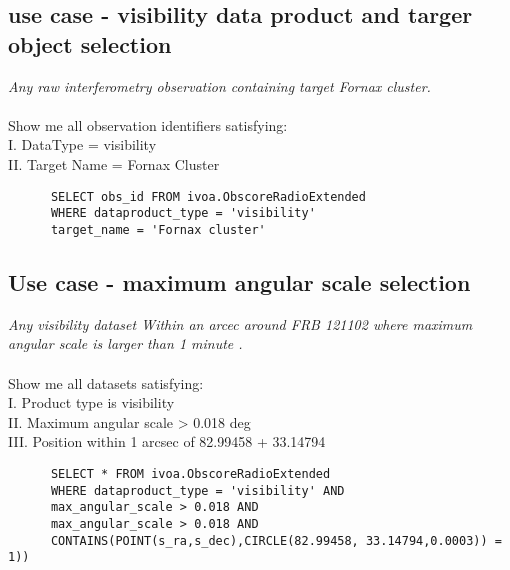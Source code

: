 

\subsection{ use case - visibility data product and targer object selection }
\textit{Any raw interferometry observation containing target Fornax cluster.}\\
\\
Show me all  observation identifiers satisfying:\\
I. DataType = visibility \\
II. Target Name = Fornax Cluster \\
\begin{verbatim}
      SELECT obs_id FROM ivoa.ObscoreRadioExtended
      WHERE dataproduct_type = 'visibility'
      target_name = 'Fornax cluster'
\end{verbatim}





\subsection{Use case - maximum angular scale selection}
\textit{Any visibility dataset Within an arcec around FRB 121102  where  maximum angular scale is larger than 1 minute .}\\ \\
Show me all datasets satisfying:\\
I. Product type is visibility \\
II. Maximum angular scale  >  0.018 deg \\
III. Position within 1 arcsec of 82.99458 + 33.14794
\begin{verbatim}
      SELECT * FROM ivoa.ObscoreRadioExtended
      WHERE dataproduct_type = 'visibility' AND
      max_angular_scale > 0.018 AND
      max_angular_scale > 0.018 AND
      CONTAINS(POINT(s_ra,s_dec),CIRCLE(82.99458, 33.14794,0.0003)) = 1))
\end{verbatim}

